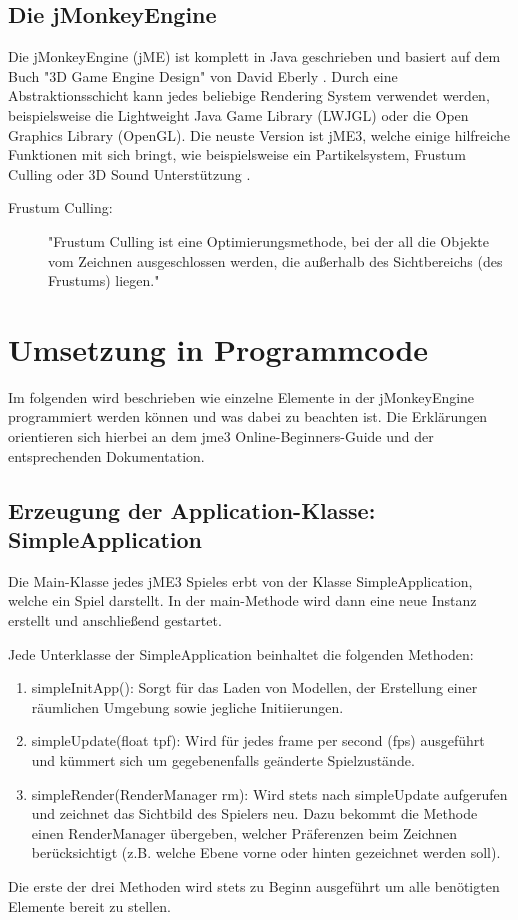 \subsection {Die jMonkeyEngine}
Die jMonkeyEngine (jME) ist komplett in Java geschrieben und basiert auf dem Buch "3D Game Engine Design" von David Eberly \cite{GE2}.
Durch eine Abstraktionsschicht kann jedes beliebige Rendering System verwendet werden, beispielsweise die Lightweight Java Game Library (LWJGL) oder die Open Graphics Library (OpenGL).
Die neuste Version ist jME3, welche einige hilfreiche Funktionen mit sich bringt, wie beispielsweise ein Partikelsystem, Frustum Culling oder 3D Sound Unterstützung \cite{JM1}.
\begin{description}
	\item[Frustum Culling:] "Frustum Culling ist eine Optimierungsmethode, bei der all die Objekte vom Zeichnen ausgeschlossen werden, die außerhalb des Sichtbereichs (des Frustums) liegen." \cite{FC1}
\end{description}


\section{Umsetzung in Programmcode}\label{sec:code}
Im folgenden wird beschrieben wie einzelne Elemente in der jMonkeyEngine programmiert werden können und was dabei zu beachten ist. Die Erklärungen orientieren sich hierbei an dem jme3 Online-Beginners-Guide \cite{BG1} und der entsprechenden Dokumentation.

\subsection{Erzeugung der Application-Klasse: SimpleApplication}
Die Main-Klasse jedes jME3 Spieles erbt von der Klasse SimpleApplication, welche ein Spiel darstellt.
In der main-Methode wird dann eine neue Instanz erstellt und anschließend gestartet.

Jede Unterklasse der SimpleApplication beinhaltet die folgenden Methoden:
\begin{enumerate}
	\item simpleInitApp():
	Sorgt für das Laden von Modellen, der Erstellung einer räumlichen Umgebung sowie jegliche Initiierungen.
	\item simpleUpdate(float tpf):
	Wird für jedes frame per second (fps) ausgeführt und kümmert sich um gegebenenfalls geänderte Spielzustände.
	\item simpleRender(RenderManager rm):
	Wird stets nach simpleUpdate aufgerufen und zeichnet das Sichtbild des Spielers neu. Dazu bekommt die Methode einen RenderManager übergeben, welcher Präferenzen beim Zeichnen berücksichtigt (z.B. welche Ebene vorne oder hinten gezeichnet werden soll).
\end{enumerate} Die erste der drei Methoden wird stets zu Beginn ausgeführt um alle benötigten Elemente bereit zu stellen.

